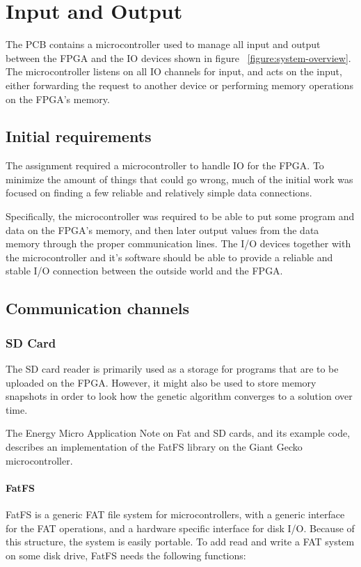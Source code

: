 \section{Input and Output}
The PCB contains a microcontroller used to manage all input and output between the FPGA and the IO devices shown in figure ~\vref{figure:system-overview}.
The microcontroller listens on all IO channels for input, and acts on the input, either forwarding the request to another device or performing memory operations on the FPGA's memory.

\subsection{Initial requirements}
The assignment required a microcontroller to handle IO for the FPGA.
To minimize the amount of things that could go wrong, much of the initial work was focused on finding a few reliable and relatively simple data connections.

Specifically, the microcontroller was required to be able to put some program and data on the FPGA's memory, and then later output values from the data memory through the proper communication lines.
The I/O devices together with the microcontroller and it's software should be able to provide a reliable and stable I/O connection between the outside world and the FPGA.

\subsection{Communication channels}
\subsubsection{SD Card}
The SD card reader is primarily used as a storage for programs that are to be uploaded on the FPGA.
However, it might also be used to store memory snapshots in order to look how the genetic algorithm converges to a solution over time.

The Energy Micro Application Note on Fat and SD cards, and its example code, describes an implementation of the FatFS library on the Giant Gecko microcontroller.\cite{an0030}

\paragraph{FatFS}\cite{fatfs-web}

FatFS is a generic FAT file system for microcontrollers, with a generic interface for the FAT operations, and a hardware specific interface for disk I/O.
Because of this structure, the system is easily portable.
To add read and write a FAT system on some disk drive, FatFS needs the following functions:

